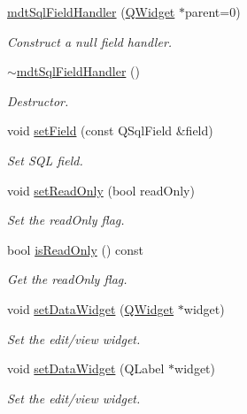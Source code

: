 \begin{DoxyCompactItemize}
\item 
\hyperlink{classmdt_sql_field_handler_a5318b5d67a26163f85ec584fdb1a00bb}{mdt\-Sql\-Field\-Handler} (\hyperlink{class_q_widget}{Q\-Widget} $\ast$parent=0)
\begin{DoxyCompactList}\small\item\em Construct a null field handler. \end{DoxyCompactList}\item 
\hyperlink{classmdt_sql_field_handler_a66e6e5c64033362b70e11745752797e6}{$\sim$mdt\-Sql\-Field\-Handler} ()
\begin{DoxyCompactList}\small\item\em Destructor. \end{DoxyCompactList}\item 
void \hyperlink{classmdt_sql_field_handler_a5c0b3077cf5f2622dd107b892ddde76c}{set\-Field} (const Q\-Sql\-Field \&field)
\begin{DoxyCompactList}\small\item\em Set S\-Q\-L field. \end{DoxyCompactList}\item 
void \hyperlink{classmdt_sql_field_handler_a0fc937dec713baad88f6def5b7088565}{set\-Read\-Only} (bool read\-Only)
\begin{DoxyCompactList}\small\item\em Set the read\-Only flag. \end{DoxyCompactList}\item 
bool \hyperlink{classmdt_sql_field_handler_ae5554c5cab22d0400a206197d66b02c6}{is\-Read\-Only} () const 
\begin{DoxyCompactList}\small\item\em Get the read\-Only flag. \end{DoxyCompactList}\item 
void \hyperlink{classmdt_sql_field_handler_ad337249c9e123d31c53ed199384825d0}{set\-Data\-Widget} (\hyperlink{class_q_widget}{Q\-Widget} $\ast$widget)
\begin{DoxyCompactList}\small\item\em Set the edit/view widget. \end{DoxyCompactList}\item 
void \hyperlink{classmdt_sql_field_handler_a66cef1add38221fbc187b6d2f8cb94c1}{set\-Data\-Widget} (Q\-Label $\ast$widget)
\begin{DoxyCompactList}\small\item\em Set the edit/view widget. \end{DoxyCompactList}\item 

\end{DoxyCompactItemize}
